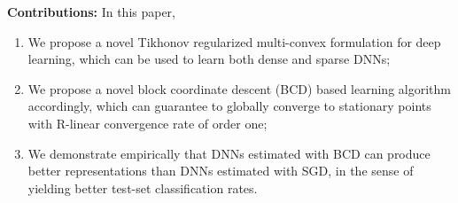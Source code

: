 \documentclass{article}
\def\eg{\emph{e.g. }}
\begin{document}
	
	
	
	
	
{\bf Contributions:} In this paper, 
\begin{enumerate}[label*=\arabic*.]
\item We propose a novel Tikhonov regularized multi-convex formulation for deep learning, which can be used to learn both dense and sparse DNNs;
\item We propose a novel block coordinate descent (BCD) based learning algorithm accordingly, which can guarantee to globally converge to stationary points with R-linear convergence rate of order one;
\item We demonstrate empirically that DNNs estimated with BCD can produce better representations than DNNs estimated with SGD, in the sense of yielding better test-set classification rates. %
	\end{enumerate}
	
\end{document}
